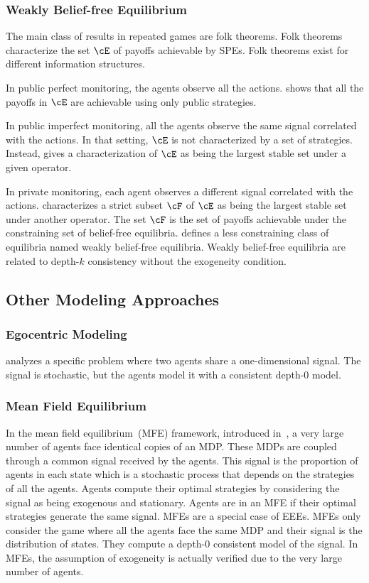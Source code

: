 \subsubsection{Weakly Belief-free Equilibrium}
The main class of results in repeated games are folk theorems.
Folk theorems characterize the set \(\cE\) of payoffs achievable by SPEs.
Folk theorems exist for different information structures.

In public perfect monitoring, the agents observe all the actions.
\cite{abreu:1988} shows that all the payoffs in \(\cE\) are achievable using only public strategies.

In public imperfect monitoring, all the agents observe the same signal correlated with the actions.
In that setting, \(\cE\) is not characterized by a set of strategies.
Instead, \cite{abreu_pearce_stacchetti:1990} gives a characterization of \(\cE\) as being the largest stable set under a given operator.

In private monitoring, each agent observes a different signal correlated with the actions.
\cite{ely_horner_olszewski:2005} characterizes a strict subset \(\cF\) of \(\cE\) as being the largest stable set under another operator.
The set \(\cF\) is the set of payoffs achievable under the constraining set of belief-free equilibria.
\cite{kandori:2011} defines a less constraining class of equilibria named weakly belief-free equilibria.
Weakly belief-free equilibria are related to depth-\(k\) consistency without the exogeneity condition.

\subsection{Other Modeling Approaches}

\subsubsection{Egocentric Modeling}
\cite{seah_shamma:2008} analyzes a specific problem where two agents share a one-dimensional signal.
The signal is stochastic, but the agents model it with a consistent depth-\(0\) model.

\subsubsection{Mean Field Equilibrium}
In the mean field equilibrium~(MFE) framework, introduced in~\cite{lasry_lions:2007}, a very large number of agents face identical copies of an MDP.
These MDPs are coupled through a common signal received by the agents.
This signal is the proportion of agents in each state which is a stochastic process that depends on the strategies of all the agents.
Agents compute their optimal strategies by considering the signal as being exogenous and stationary.
Agents are in an MFE if their optimal strategies generate the same signal.
MFEs are a special case of EEEs.
MFEs only consider the game where all the agents face the same MDP and their signal is the distribution of states.
They compute a depth-\(0\) consistent model of the signal.
In MFEs, the assumption of exogeneity is actually verified due to the very large number of agents.

